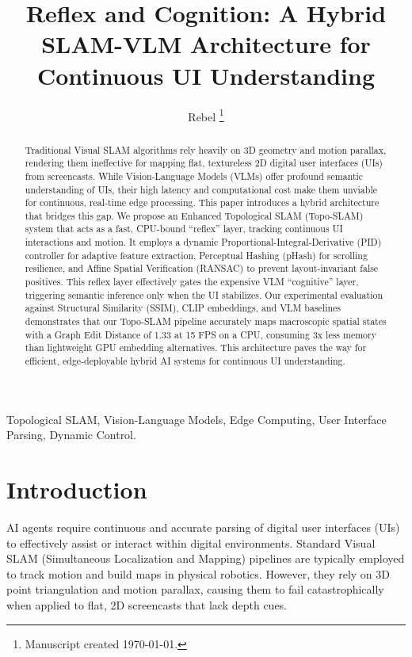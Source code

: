 \documentclass[journal]{IEEEtran}
\begin{document}
\title{Reflex and Cognition: A Hybrid SLAM-VLM Architecture for Continuous UI Understanding}

\author{Rebel
\thanks{Manuscript created \today.}}

\maketitle

\begin{abstract}
Traditional Visual SLAM algorithms rely heavily on 3D geometry and motion parallax, rendering them ineffective for mapping flat, textureless 2D digital user interfaces (UIs) from screencasts. While Vision-Language Models (VLMs) offer profound semantic understanding of UIs, their high latency and computational cost make them unviable for continuous, real-time edge processing. This paper introduces a hybrid architecture that bridges this gap. We propose an Enhanced Topological SLAM (Topo-SLAM) system that acts as a fast, CPU-bound ``reflex'' layer, tracking continuous UI interactions and motion. It employs a dynamic Proportional-Integral-Derivative (PID) controller for adaptive feature extraction, Perceptual Hashing (pHash) for scrolling resilience, and Affine Spatial Verification (RANSAC) to prevent layout-invariant false positives. This reflex layer effectively gates the expensive VLM ``cognitive'' layer, triggering semantic inference only when the UI stabilizes. Our experimental evaluation against Structural Similarity (SSIM), CLIP embeddings, and VLM baselines demonstrates that our Topo-SLAM pipeline accurately maps macroscopic spatial states with a Graph Edit Distance of 1.33 at 15 FPS on a CPU, consuming 3x less memory than lightweight GPU embedding alternatives. This architecture paves the way for efficient, edge-deployable hybrid AI systems for continuous UI understanding.
\end{abstract}

\begin{IEEEkeywords}
Topological SLAM, Vision-Language Models, Edge Computing, User Interface Parsing, Dynamic Control.
\end{IEEEkeywords}

\section{Introduction}
 AI agents require continuous and accurate parsing of digital user interfaces (UIs) to effectively assist or interact within digital environments. Standard Visual SLAM (Simultaneous Localization and Mapping) pipelines are typically employed to track motion and build maps in physical robotics. However, they rely on 3D point triangulation and motion parallax, causing them to fail catastrophically when applied to flat, 2D screencasts that lack depth cues. 
\end{document}
